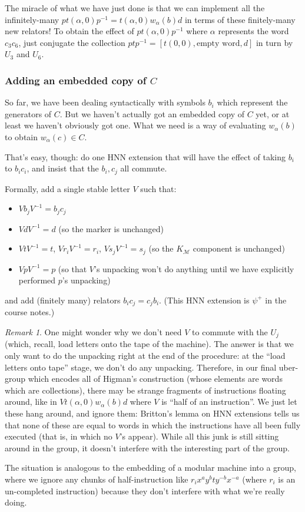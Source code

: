 \documentclass[11pt]{amsart}
\theoremstyle{remark}
\newtheorem*{remark}{Remark}
\begin{document}
The miracle of what we have just done is that we can implement all the infinitely-many $p t(\alpha, 0) p^{-1} = t(\alpha, 0) w_{\alpha}(b) d$ in terms of these finitely-many new relators!
To obtain the effect of $p t(\alpha, 0) p^{-1}$ where $\alpha$ represents the word $c_3 c_6$, just conjugate the collection $ptp^{-1} = [t(0,0), \text{empty word}, d]$ in turn by $U_3$ and $U_6$.

\subsubsection{Adding an embedded copy of $C$}

So far, we have been dealing syntactically with symbols $b_i$ which represent the generators of $C$.
But we haven't actually got an embedded copy of $C$ yet, or at least we haven't obviously got one.
What we need is a way of evaluating $w_{\alpha}(b)$ to obtain $w_{\alpha}(c) \in C$.

That's easy, though: do one HNN extension that will have the effect of taking $b_i$ to $b_i c_i$, and insist that the $b_i, c_j$ all commute.

Formally, add a single stable letter $V$ such that:
\begin{itemize}
\item $V b_j V^{-1} = b_j c_j$
\item $V d V^{-1} = d$ (so the marker is unchanged)
\item $V t V^{-1} = t$, $V r_i V^{-1} = r_i$, $V s_j V^{-1} = s_j$ (so the $K_{\mathcal{M}}$ component is unchanged)
\item $V p V^{-1} = p$  (so that $V$'s unpacking won't do anything until we have explicitly performed $p$'s unpacking)
\end{itemize}
and add (finitely many) relators $b_i c_j = c_j b_i$.
(This HNN extension is $\psi^+$ in the course notes.)

\begin{remark}
One might wonder why we don't need $V$ to commute with the $U_j$ (which, recall, load letters onto the tape of the machine).
The answer is that we only want to do the unpacking right at the end of the procedure:
at the ``load letters onto tape'' stage, we don't do any unpacking.
Therefore, in our final uber-group which encodes all of Higman's construction (whose elements are words which are collections),
there may be strange fragments of instructions floating around, like in $V t(\alpha, 0) w_{\alpha}(b) d$ where $V$ is ``half of an instruction''.
We just let these hang around, and ignore them: Britton's lemma on HNN extensions tells us that none of these are equal to words in which
the instructions have all been fully executed (that is, in which no $V$'s appear).
While all this junk is still sitting around in the group, it doesn't interfere with the interesting part of the group.

The situation is analogous to the embedding of a modular machine into a group, where we ignore any chunks of half-instruction like $r_i x^a y^b t y^{-b} x^{-a}$ (where $r_i$ is an un-completed instruction) because they don't interfere with what we're really doing.
\end{remark}
\end{document}
